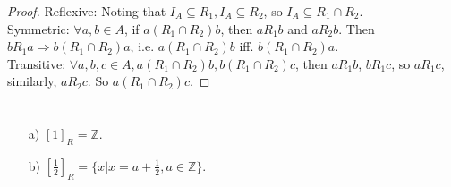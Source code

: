 \documentclass{article}
\begin{document}
\begin{proof}
    Reflexive: Noting that $I_A \subseteq R_1, I_A \subseteq R_2$, so $I_A \subseteq R_1 \cap R_2$. \\
    Symmetric: $\forall a, b \in A$, if $a(R_1 \cap R_2)b$, then $aR_1b$ and $aR_2b$. Then $bR_1a \Rightarrow b(R_1 \cap R_2)a$, i.e. $a(R_1 \cap R_2)b$ iff. $b(R_1 \cap R_2)a$. \\
    Transitive: $\forall a, b, c \in A, a(R_1 \cap R_2)b, b(R_1 \cap R_2)c$, then $aR_1b$, $bR_1c$, so $aR_1c$, similarly, $aR_2c$. So $a(R_1 \cap R_2)c$.
\end{proof}

\section{}

\begin{itemize}
    \item [a)] $[1]_R = \mathbb{Z}$.
    \item [b)] $\left[\frac{1}{2}\right]_R = \{x | x = a + \frac{1}{2}, a \in \mathbb{Z}\}$.
\end{itemize}

\section{}
\end{document}
